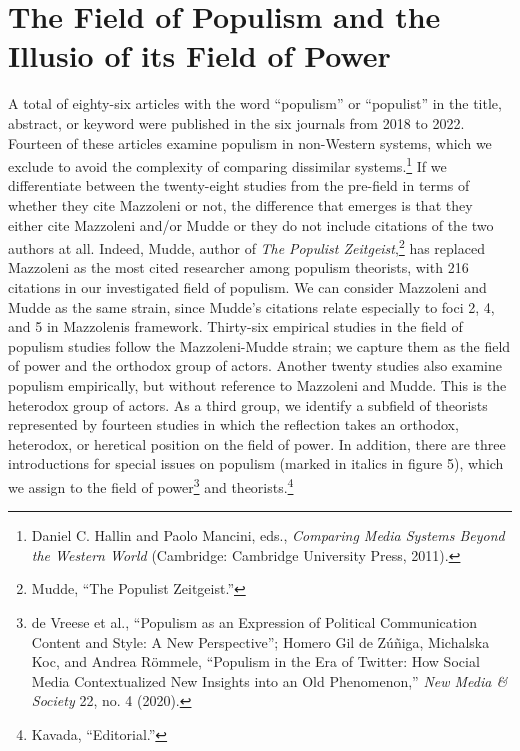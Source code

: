 \documentclass{tufte-handout}
\begin{document}
\hypertarget{the-field-of-populism-and-the-illusio-of-its-field-of-power}{%
\section{The Field of Populism and the Illusio of its Field of
Power}\label{the-field-of-populism-and-the-illusio-of-its-field-of-power}}

A total of eighty-six articles with the word ``populism'' or
``populist'' in the title, abstract, or keyword were published in the
six journals from 2018 to 2022. Fourteen of these articles examine
populism in non-Western systems, which we exclude to avoid the
complexity of comparing dissimilar systems.\footnote{Daniel C. Hallin
  and Paolo Mancini, eds., \emph{Comparing Media Systems Beyond the
  Western World} (Cambridge: Cambridge University Press, 2011).} If we
differentiate between the twenty-eight studies from the pre-field in
terms of whether they cite Mazzoleni or not, the difference that emerges
is that they either cite Mazzoleni and/or Mudde or they do not include
citations of the two authors at all. Indeed, Mudde, author of \emph{The}
\emph{Populist Zeitgeist},\footnote{Mudde, ``The Populist Zeitgeist.''}
has replaced Mazzoleni as the most cited researcher among populism
theorists, with 216 citations in our investigated field of populism. We
can consider Mazzoleni and Mudde as the same strain, since Mudde's
citations relate especially to foci 2, 4, and 5 in
Mazzoleni\textquotesingle s framework. Thirty-six empirical studies in
the field of populism studies follow the Mazzoleni-Mudde strain; we
capture them as the field of power and the orthodox group of actors.
Another twenty studies also examine populism empirically, but without
reference to Mazzoleni and Mudde. This is the heterodox group of actors.
As a third group, we identify a subfield of theorists represented by
fourteen studies in which the reflection takes an orthodox, heterodox,
or heretical position on the field of power. In addition, there are
three introductions for special issues on populism (marked in italics in
figure 5), which we assign to the field of power\footnote{de Vreese et
  al., ``Populism as an Expression of Political Communication Content
  and Style: A New Perspective''; Homero Gil de Zúñiga, Michalska Koc,
  and Andrea Römmele, ``Populism in the Era of Twitter: How Social Media
  Contextualized New Insights into an Old Phenomenon,'' \emph{New Media
  \& Society} 22, no. 4 (2020).} and theorists.\footnote{Kavada,
  ``Editorial.''}
\end{document}
